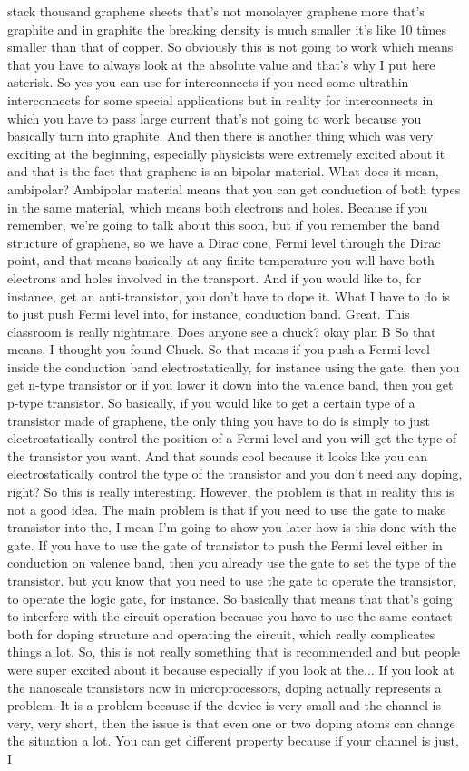 stack thousand graphene sheets that's not monolayer graphene more that's graphite and in graphite the breaking density is much smaller it's like 10 times smaller than that of copper. So obviously this is not going to work which means that you have to always look at the absolute value and that's why I put here asterisk. So yes you can use for interconnects if you need some ultrathin interconnects for some special applications but in reality for interconnects in which you have to pass large current that's not going to work because you basically turn into graphite. And then there is another thing which was very exciting at the beginning, especially physicists were extremely excited about it and that is the fact that graphene is an bipolar material. What does it mean, ambipolar? Ambipolar material means that you can get conduction of both types in the same material, which means both electrons and holes. Because if you remember, we're going to talk about this soon, but if you remember the band structure of graphene, so we have a Dirac cone, Fermi level through the Dirac point, and that means basically at any finite temperature you will have both electrons and holes involved in the transport. And if you would like to, for instance, get an anti-transistor, you don't have to dope it. What I have to do is to just push Fermi level into, for instance, conduction band. Great. This classroom is really nightmare. Does anyone see a chuck? okay plan B So that means, I thought you found Chuck. So that means if you push a Fermi level inside the conduction band electrostatically, for instance using the gate, then you get n-type transistor or if you lower it down into the valence band, then you get p-type transistor. So basically, if you would like to get a certain type of a transistor made of graphene, the only thing you have to do is simply to just electrostatically control the position of a Fermi level and you will get the type of the transistor you want. And that sounds cool because it looks like you can electrostatically control the type of the transistor and you don't need any doping, right? So this is really interesting. However, the problem is that in reality this is not a good idea. The main problem is that if you need to use the gate to make transistor into the, I mean I'm going to show you later how is this done with the gate. If you have to use the gate of transistor to push the Fermi level either in conduction on valence band, then you already use the gate to set the type of the transistor. but you know that you need to use the gate to operate the transistor, to operate the logic gate, for instance. So basically that means that that's going to interfere with the circuit operation because you have to use the same contact both for doping structure and operating the circuit, which really complicates things a lot. So, this is not really something that is recommended and but people were super excited about it because especially if you look at the... If you look at the nanoscale transistors now in microprocessors, doping actually represents a problem. It is a problem because if the device is very small and the channel is very, very short, then the issue is that even one or two doping atoms can change the situation a lot. You can get different property because if your channel is just, I 
